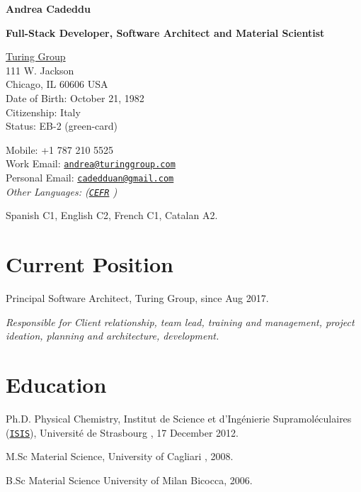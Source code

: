 \documentclass[11pt,letterpaper]{article}
\def\name{Andrea Cadeddu }
\renewenvironment{itemize}{
  \begin{list}{}{
    \setlength{\leftmargin}{1.5em}
  }
}{
  \end{list}
}
\begin{document}
{\huge \bf \name}

\vspace{0.25in}
{\Large \bf \sffamily Full-Stack Developer, Software Architect and Material Scientist}

\vspace{0.25in}

\begin{minipage}[t]{0.5\textwidth}
  \href{http://www.turinggroup.com}{Turing Group} \\
  111 W. Jackson\\
Chicago, IL 60606
  USA \\
  Date of Birth: October 21, 1982 \\
  Citizenship: Italy\\
  Status: EB-2 (green-card)
\end{minipage}
\begin{minipage}[t]{0.5\textwidth}
  Mobile: +1 787 210 5525\\
  Work Email: \href{mailto:andrea@turinggroup.com}{\tt andrea@turinggroup.com} \\
  Personal Email: \href{mailto:cadedduan@gmail.com}{\tt cadedduan@gmail.com} \\
  \textit{Other Languages: (\href{http://en.wikipedia.org/wiki/Common_European_Framework_of_Reference_for_Languages}{\tt CEFR} )} 

Spanish C1,
English C2, 
French C1,
Catalan A2.

\end{minipage}

\section*{Current Position}

\begin{itemize}
\item Principal Software Architect, Turing Group, since Aug 2017. 

\textit{Responsible for Client relationship, team lead, training and management, project ideation, planning and architecture, development.}

\end{itemize}
\section*{Education}

\begin{itemize}

  \item  Ph.D. Physical Chemistry, Institut de Science et d'Ing\'enierie Supramol\'eculaires (\href{http://www-isis.u-strasbg.fr/}{\texttt{ISIS}}), Universit\'e de Strasbourg , 17 December 2012.

  \item  M.Sc Material Science, University of Cagliari , 2008.

  \item B.Sc Material Science University of Milan Bicocca, 2006.
  
\end{itemize}
\end{document}
